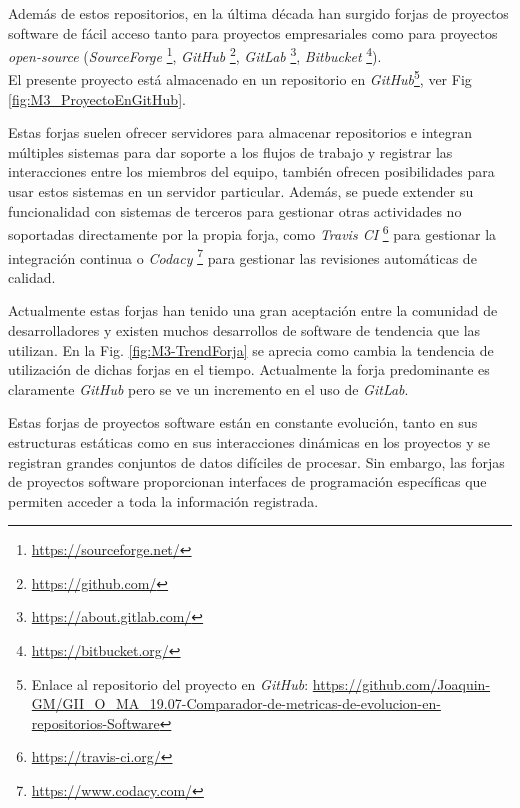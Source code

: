 Además de estos repositorios, en la última década han surgido forjas de proyectos software de fácil acceso tanto para proyectos empresariales como para proyectos \textit{open-source} (\textit{SourceForge} \footnote{\url{https://sourceforge.net/}}, \textit{GitHub} \footnote{\url{https://github.com/}}, \textit{GitLab} \footnote{\url{https://about.gitlab.com/}}, \textit{Bitbucket}  \footnote{\url{https://bitbucket.org/}}).\\

El presente proyecto está almacenado en un repositorio en \textit{GitHub}\footnote{Enlace al repositorio del proyecto en \textit{GitHub}: \url{https://github.com/Joaquin-GM/GII_O_MA_19.07-Comparador-de-metricas-de-evolucion-en-repositorios-Software}}, ver Fig \ref{fig:M3_ProyectoEnGitHub}.


Estas forjas suelen ofrecer servidores para almacenar repositorios e integran múltiples sistemas para dar soporte a los flujos de trabajo y registrar las interacciones entre los miembros del equipo, también ofrecen posibilidades para usar estos sistemas en un servidor particular. Además, se puede extender su funcionalidad con sistemas de terceros para gestionar otras actividades no soportadas directamente por la propia forja, como \textit{Travis CI} \footnote{\url{https://travis-ci.org/}} para gestionar la integración continua o \textit{Codacy} \footnote{\url{https://www.codacy.com/}} para gestionar las revisiones automáticas de calidad. 

Actualmente estas forjas han tenido una gran aceptación entre la comunidad de desarrolladores y existen muchos desarrollos de software de tendencia que las utilizan. En la Fig. \ref{fig:M3-TrendForja} se aprecia como cambia la tendencia de utilización de dichas forjas en el tiempo. Actualmente la forja predominante es claramente \textit{GitHub} pero se ve un incremento en el uso de \textit{GitLab}.


Estas forjas de proyectos software están en constante evolución, tanto en sus estructuras estáticas como en sus interacciones dinámicas en los proyectos y se registran grandes conjuntos de datos difíciles de procesar. Sin embargo, las forjas de proyectos software proporcionan interfaces de programación específicas que permiten acceder a toda la información registrada.

